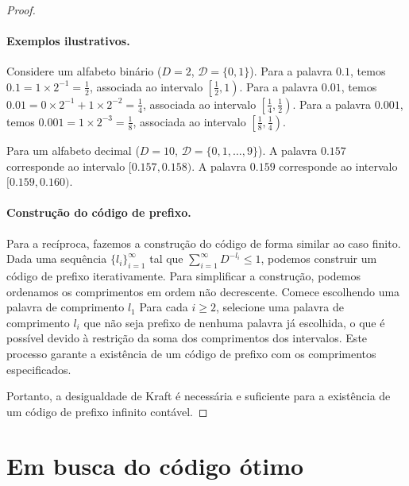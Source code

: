 \begin{proof}
\begin{marginfigure}
{\begin{tikzpicture}
    \end{tikzpicture}
    }
    \caption{Ilustração dos intervalos disjuntos associados a palavras binárias de um código de prefixo, contidos no intervalo $[0,1)$.}
    \label{fig:kraftintervals}
\end{marginfigure}


\paragraph{Exemplos ilustrativos.}
Considere um alfabeto binário ($D=2$, $\mathcal{D} = \{0,1\}$).
Para a palavra $0.1$, temos $0.1 = 1 \times 2^{-1} = \frac{1}{2}$, associada ao intervalo $\left[\frac{1}{2}, 1\right)$.
Para a palavra $0.01$, temos $0.01 = 0 \times 2^{-1} + 1 \times 2^{-2} = \frac{1}{4}$, associada ao intervalo $\left[\frac{1}{4}, \frac{1}{2}\right)$.
Para a palavra $0.001$, temos $0.001 = 1 \times 2^{-3} = \frac{1}{8}$, associada ao intervalo $\left[\frac{1}{8}, \frac{1}{4}\right)$.

Para um alfabeto decimal ($D=10$, $\mathcal{D} = \{0,1,\dots,9\}$).
A palavra $0.157$ corresponde ao intervalo $[0.157, 0.158)$.
A palavra $0.159$ corresponde ao intervalo $[0.159, 0.160)$.

\paragraph{Construção do código de prefixo.}
Para a recíproca, fazemos a construção do código de forma similar ao caso finito.
Dada uma sequência $\{l_i\}_{i=1}^\infty$ tal que
$\sum_{i=1}^\infty D^{-l_i} \leq 1$, podemos construir um código de
prefixo iterativamente. Para simplificar a construção, podemos ordenamos os comprimentos em ordem não decrescente.
Comece escolhendo uma palavra de comprimento $l_1$
Para cada $i \geq 2$, selecione uma
palavra de comprimento $l_i$ que não seja prefixo de nenhuma palavra já
escolhida, o que é possível devido à restrição da soma dos comprimentos dos
intervalos. Este processo garante a existência de um código de prefixo com os
comprimentos especificados.

Portanto, a desigualdade de Kraft é necessária e suficiente para a existência
de um código de prefixo infinito contável.
\end{proof}
 




\section{Em busca do código ótimo}

